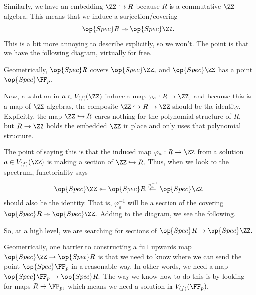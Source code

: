 Similarly, we have an embedding $\ZZ\hookrightarrow R$ because $R$ is a commutative $\ZZ$-algebra. This means that we induce a surjection/covering
\[\op{Spec}R\twoheadrightarrow\op{Spec}\ZZ.\]
This is a bit more annoying to describe explicitly, so we won't. The point is that we have the following diagram, virtually for free.
\begin{center}
\end{center}
Geometrically, $\op{Spec}R$ covers $\op{Spec}\ZZ,$ and $\op{Spec}\ZZ$ has a point $\op{Spec}\FF_p.$

Now, a solution in $a\in V_{(f)}(\ZZ)$ induce a map $\varphi_a:R\to\ZZ,$ and because this is a map of $\ZZ$-algebras, the composite $\ZZ\hookrightarrow R\to\ZZ$ should be the identity. Explicitly, the map $\ZZ\hookrightarrow R$ cares nothing for the polynomial structure of $R,$ but $R\to\ZZ$ holds the embedded $\ZZ$ in place and only uses that polynomial structure.

The point of saying this is that the induced map $\varphi_a:R\to\ZZ$ from a solution $a\in V_{(f)}(\ZZ)$ is making a section of $\ZZ\hookrightarrow R.$ Thus, when we look to the spectrum, functoriality says
\[\op{Spec}\ZZ\twoheadleftarrow\op{Spec}R\stackrel{\varphi_a^{-1}}\leftarrow\op{Spec}\ZZ\]
should also be the identity. That is, $\varphi_a^{-1}$ will be a section of the covering $\op{Spec}R\twoheadrightarrow\op{Spec}\ZZ.$ Adding to the diagram, we see the following.
\begin{center}
\end{center}
So, at a high level, we are searching for sections of $\op{Spec}R\to\op{Spec}\ZZ.$

Geometrically, one barrier to constructing a full upwards map $\op{Spec}\ZZ\to\op{Spec}R$ is that we need to know where we can send the point $\op{Spec}\FF_p$ in a reasonable way. In other words, we need a map $\op{Spec}\FF_p\to\op{Spec}R.$ The way we know how to do this is by looking for maps $R\to\FF_p,$ which means we need a solution in $V_{(f)}(\FF_p).$

